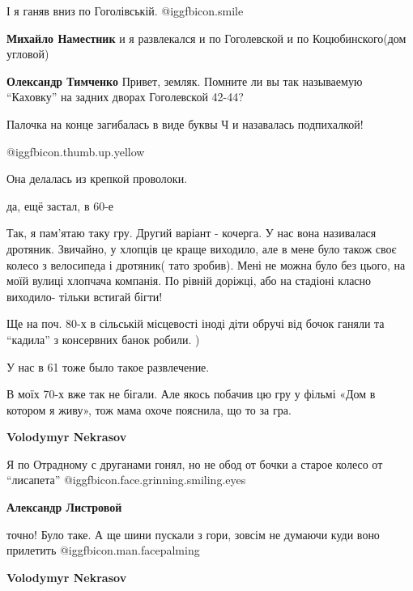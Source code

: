 \begin{itemize}
І я ганяв вниз по Гоголівській.  @igg{fbicon.smile} 

\begin{itemize} %
\textbf{Михайло Наместник} и я развлекался и по Гоголевской и по Коцюбинского(дом угловой)

\textbf{Олександр Тимченко} Привет, земляк. Помните ли вы так называемую \enquote{Каховку} на задних дворах Гоголевской 42-44?
\end{itemize} %

Палочка на конце загибалась в виде буквы Ч и назавалась подпихалкой!

 @igg{fbicon.thumb.up.yellow} 

Она делалась из крепкой проволоки.

да, ещё застал, в 60-е


Так, я пам'ятаю таку гру. Другий варіант - кочерга. У нас вона називалася
дротяник. Звичайно, у хлопців це краще виходило, але в мене було також своє
колесо з велосипеда і дротяник( тато зробив). Мені не можна було без цього, на
моїй вулиці хлопчача компанія. По рівній доріжці, або на стадіоні класно
виходило- тільки встигай бігти!


Ще на поч. 80-х в сільській місцевості іноді діти обручі від бочок ганяли та
\enquote{кадила} з консервних банок робили. )

У нас в 61 тоже было такое развлечение.


В моїх 70-х вже так не бігали. Але якось побачив цю гру у фільмі «Дом в котором
я живу», тож мама охоче пояснила, що то за гра.

\begin{itemize} %
\textbf{Volodymyr Nekrasov} 

Я по Отрадному с друганами гонял, но не обод от бочки а старое колесо от
\enquote{лисапета}  @igg{fbicon.face.grinning.smiling.eyes} 

\textbf{Александр Листровой} 

точно! Було таке. А ще шини пускали з гори, зовсім не думаючи куди воно
прилетить  @igg{fbicon.man.facepalming} 

\textbf{Volodymyr Nekrasov} 


\end{itemize}
\end{itemize}
